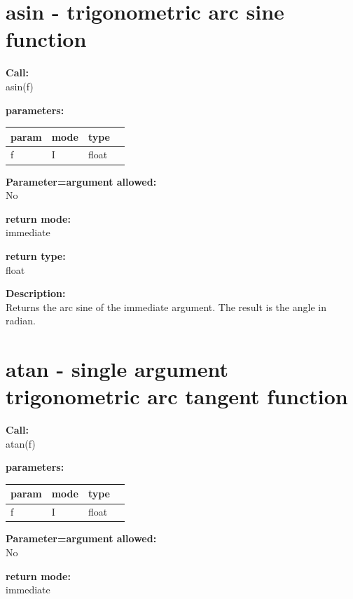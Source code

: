     \section{asin - trigonometric arc sine function}\label{sec:ifasin}
        
        
        {\bf Call:} \\
        asin(f)
        
        {\bf parameters:} \\
        \begin{tabular}{| l | l | l | l |}
        \hline
        param  & mode & type & \\
        \hline \hline
        f & I & float & \\ \hline
        \end{tabular}
        
        {\bf Parameter=argument allowed:} \\
        No
        
        {\bf return mode:} \\
        immediate

        {\bf return type:} \\
        float
        
        {\bf Description:} \\
        Returns the arc sine of the immediate argument. The result is the
        angle in radian.


    \section{atan - single argument trigonometric arc tangent function}\label{sec:ifatan}
        
        
        {\bf Call:} \\
        atan(f)
        
        {\bf parameters:} \\
        \begin{tabular}{| l | l | l | l |}
        \hline
        param  & mode & type & \\
        \hline \hline
        f & I & float & \\ \hline
        \end{tabular}
        
        {\bf Parameter=argument allowed:} \\
        No
        
        {\bf return mode:} \\
        immediate

